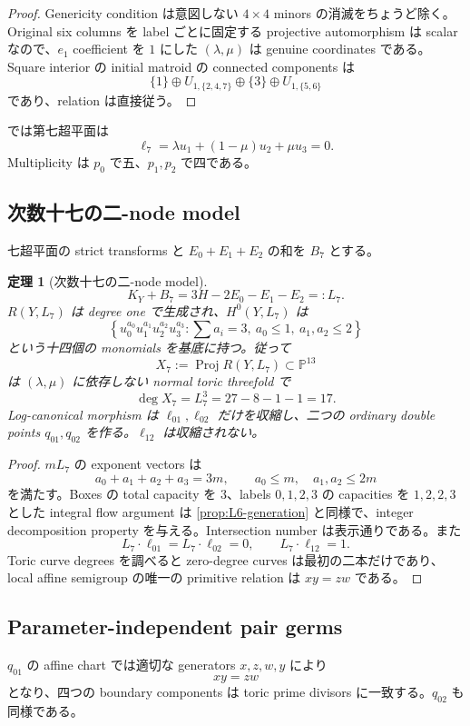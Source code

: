 \documentclass[11pt,a4paper]{ltjsarticle}
\newcommand{\PP}{\mathbb P}\newcommand{\RR}{\mathbb R}\newcommand{\CC}{\mathbb C}
\theoremstyle{plain}
\newtheorem{theorem}{定理}[section]\newtheorem{proposition}[theorem]{命題}
\theoremstyle{definition}
\theoremstyle{remark}
\begin{document}
\begin{proof}
Genericity condition は意図しない $4\times4$ minors の消滅をちょうど除く。Original six columns を label ごとに固定する projective automorphism は scalar なので、$e_1$ coefficient を $1$ にした $(\lambda,\mu)$ は genuine coordinates である。Square interior の initial matroid の connected components は
\[
 \{1\}\oplus U_{1,\{2,4,7\}}\oplus\{3\}\oplus U_{1,\{5,6\}}
\]
であり、relation は直接従う。
\end{proof}

 では第七超平面は
\begin{equation}\label{eq:H7}
 \ell_7=\lambda u_1+(1-\mu)u_2+\mu u_3=0.
\end{equation}
Multiplicity は $p_0$ で五、$p_1,p_2$ で四である。

\subsection{次数十七の二-node model}
七超平面の strict transforms と $E_0+E_1+E_2$ の和を $B_7$ とする。

\begin{theorem}[次数十七の二-node model]\label{thm:X7}
\[
 K_Y+B_7=3H-2E_0-E_1-E_2=:L_7.
\]
$R(Y,L_7)$ は degree one で生成され、$H^0(Y,L_7)$ は
\[
 \left\{u_0^{a_0}u_1^{a_1}u_2^{a_2}u_3^{a_3}:
 \sum a_i=3,\ a_0\le1,\ a_1,a_2\le2\right\}
\]
という十四個の monomials を基底に持つ。従って
\[
 X_7:=\operatorname{Proj}R(Y,L_7)\subset\PP^{13}
\]
は $(\lambda,\mu)$ に依存しない normal toric threefold で
\[
 \deg X_7=L_7^3=27-8-1-1=17.
\]
Log-canonical morphism は $\ell_{01},\ell_{02}$ だけを収縮し、二つの ordinary double points $q_{01},q_{02}$ を作る。$\ell_{12}$ は収縮されない。
\end{theorem}

\begin{proof}
$mL_7$ の exponent vectors は
\[
 a_0+a_1+a_2+a_3=3m,
 \qquad a_0\le m,\quad a_1,a_2\le2m
\]
を満たす。Boxes の total capacity を $3$、labels $0,1,2,3$ の capacities を $1,2,2,3$ とした integral flow argument は \cref{prop:L6-generation} と同様で、integer decomposition property を与える。Intersection number は表示通りである。また
\[
 L_7\cdot\ell_{01}=L_7\cdot\ell_{02}=0,
 \qquad L_7\cdot\ell_{12}=1.
\]
Toric curve degrees を調べると zero-degree curves は最初の二本だけであり、local affine semigroup の唯一の primitive relation は $xy=zw$ である。
\end{proof}

\subsection{Parameter-independent pair germs}
$q_{01}$ の affine chart では適切な generators $x,z,w,y$ により
\begin{equation}\label{eq:node-relation}
 xy=zw
\end{equation}
となり、四つの boundary components は toric prime divisors に一致する。$q_{02}$ も同様である。
\end{document}
